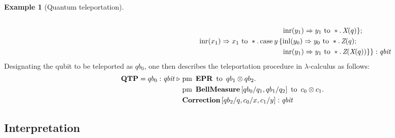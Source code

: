 \documentclass[10pt,a4paper]{amsart}
\theoremstyle{definition}
\theoremstyle{definition}
\newtheorem{example}[definition]{Example}
\theoremstyle{definition}
\theoremstyle{definition}
\theoremstyle{definition}
\theoremstyle{definition}
\begin{document}
\begin{example}[Quantum teleportation]
\begin{align*}
                \\
   &   \hspace{333pt} \inr (y_{1}) \Rightarrow y_1 \text{ to } \ast. \, \emph{X}
(q)\} ; \\ 
   & \hspace{215pt}\inr (x_{1})  \Rightarrow x_1 \text{ to } \ast. \,
        \text{case}\hspace{2pt} y\,  \{\inl (y_{0})  \Rightarrow
        y_0 \text{ to } \ast. \, \emph{Z}(q);  
\\ 
   &\hspace{333pt} \inr (y_{1}) \Rightarrow{} y_1 \text{ to } \ast. \, \emph{Z}
(\emph{X}(q)) \}\} : \emph{qbit}
\end{align*}
Designating the qubit to be teleported as $qb_0$, one then describes the
teleportation procedure in $\lambda$-calculus as follows:
 \begin{align*}
  \textbf{QTP} = qb_{0}: \textit{qbit}\hspace{3 pt} \triangleright \hspace{3 pt} & \text{pm} \hspace{5pt} \textbf{EPR} \hspace{5pt} \text{to} \hspace{5pt}  qb_{1} \otimes qb_{2}.  \notag \\
     & \text{pm}\hspace{5pt} \textbf{BellMeasure}\, [qb_0/q_1,qb_{1}/q_2] \hspace{5pt}  \text{to} \hspace{5pt} c_{0}\otimes c_{1} . \notag \\
     & \textbf{Correction}\, [qb_{2}/q,c_{0}/x, c_{1}/y] 
     : \emph{qbit} 
 \end{align*}

\end{example}
 
 \subsection{Interpretation}
\end{document}
